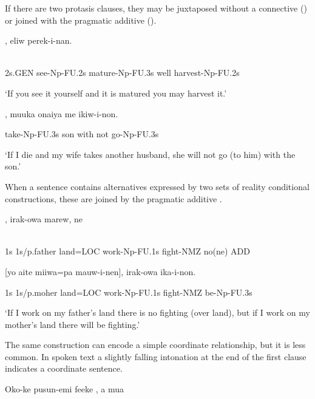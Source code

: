 If there are two protasis clauses, they may be juxtaposed without a connective () or joined with the pragmatic additive  ().

\ea%
\label{ex:x1635}
,  eliw  perek-i-nan.  \\
      \\
\glt
\z

2s.GEN  see-Np-FU.2s  mature-Np-FU.3s  well  harvest-Np-FU.2s

`If you see it yourself and it is matured you may harvest it.'

\ea%
\label{ex:x1643}
,  muuka  onaiya  me  ikiw-i-non.

take-Np-FU.3s  son  with  not  go-Np-FU.3s

`If I die and my wife takes another husband, she will not go (to him) with the son.'

When a sentence contains alternatives expressed by two sets of reality conditional constructions, these are joined by the pragmatic additive .

\ea%
\label{ex:x1642}
\gll [Yo  auwa  miiwa=pa  mauw-i-nen],  irak-owa  marew,  ne \\
      \\
\glt
\z

1s  1s/p.father  land=LOC  work-Np-FU.1s  fight-NMZ  no(ne)  ADD

[yo  aite  miiwa=pa  mauw-i-nen],  irak-owa  ika-i-non.

1s  1s/p.moher  land=LOC  work-Np-FU.1s  fight-NMZ  be-Np-FU.3s

`If I work on my father's land there is no fighting (over land), but if I work on my mother's land there will be fighting.'

The same construction can encode a simple coordinate relationship, but it is less common. In spoken text a slightly falling intonation at the end of the first clause indicates a coordinate sentence.

\ea%
\label{ex:x1850}
\gll Oko-ke  pusun-emi  feeke  \textstyleEmphasizedVernacularWords{-}\textstyleEmphasizedVernacularWords{-},  a  mua   \\
      \\
\glt
\z


